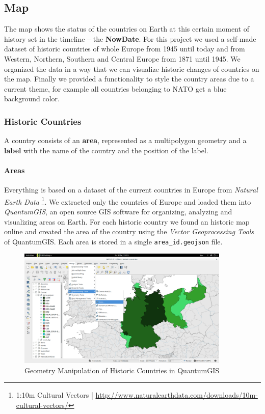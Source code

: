 \subsection{Map}
The map shows the status of the countries on Earth at this certain moment of history set in the timeline -- the \textbf{NowDate}. For this project we used a self-made dataset of historic countries of whole Europe from 1945 until today and from Western, Northern, Southern and Central Europe from 1871 until 1945. We organized the data in a way that we can visualize historic changes of countries on the map. Finally we provided a functionality to style the country areas due to a current theme, for example all countries belonging to NATO get a blue background color.

\subsubsection{Historic Countries} %
\label{ssub:historic_countries}

A country consists of an \textbf{area}, represented as a multipolygon geometry and a \textbf{label} with the name of the country and the position of the label.

\newpage
\paragraph{Areas}
Everything is based on a dataset of the current countries in Europe from \textit{Natural Earth Data}
\footnote{1:10m Cultural Vectors | \url{http://www.naturalearthdata.com/downloads/10m-cultural-vectors/}}.
We extracted only the countries of Europe and loaded them into \textit{QuantumGIS}, an open source GIS software for organizing, analyzing and visualizing areas on Earth. For each historic country we found an historic map online and created the area of the country using the \textit{Vector Geoprocessing Tools} of QuantumGIS. Each area is stored in a single \texttt{area\_id.geojson} file.

\begin{figure}[H]
  \begin{center}
    \includegraphics[width=0.9\textwidth]{graphics/qgis.png}
  \end{center}
  \caption{Geometry Manipulation of Historic Countries in QuantumGIS}
  \label{fig:qgis}
\end{figure}
\label{par:area}

